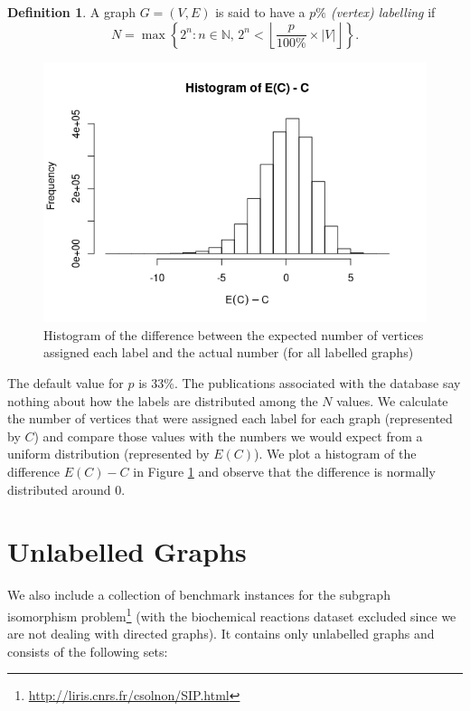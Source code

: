 \documentclass{l4proj}
\theoremstyle{definition}
\newtheorem{definition}{Definition}[chapter]
\theoremstyle{remark}
\begin{document}
\begin{definition} \label{def:percent_labelling}
  A graph $G = (V, E)$ is said to have a \emph{$p\%$ (vertex) labelling} if
  \[ N = \max \left\{ 2^n : n \in \mathbb{N},\, 2^n < \left\lfloor \frac{p}{100\%}
        \times |V| \right\rfloor \right\}. \]
\end{definition}

\begin{figure}
  \centering
  \includegraphics[scale=0.7]{images/labelling_histogram.png}
  \caption{Histogram of the difference between the expected number of vertices
    assigned each label and the actual number (for all labelled graphs)}
  \label{figure:labelling_histogram}
\end{figure}

The default value for $p$ is 33\%. The publications associated with the database
\cite{foggia2001-2, DBLP:journals/prl/SantoFSV03} say nothing about how the
labels are distributed among the $N$ values. We calculate the number of vertices
that were assigned each label for each graph (represented by $C$) and compare
those values with the numbers we would expect from a uniform distribution
(represented by $E(C)$). We plot a histogram of the difference $E(C) - C$ in
Figure \ref{figure:labelling_histogram} and observe that the difference is
normally distributed around 0.

\section{Unlabelled Graphs} \label{sec:unlabelled}
We also include a collection of benchmark instances for the subgraph isomorphism
problem\footnote{\url{http://liris.cnrs.fr/csolnon/SIP.html}} (with the
biochemical reactions dataset excluded since we are not dealing with directed
graphs). It contains only unlabelled graphs and consists of the following sets:
\end{document}
